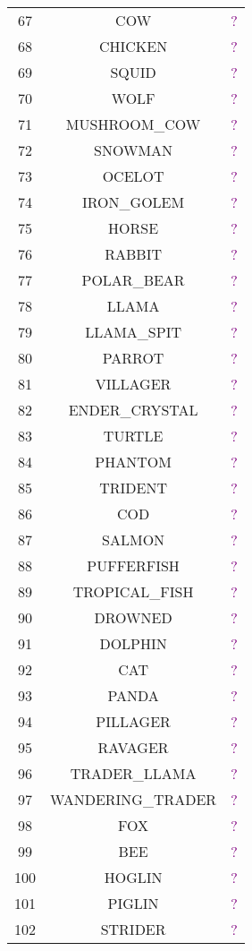 \documentclass[11pt]{article}
\newcommand\myworries[1]{\textcolor{purple}{#1}}
\begin{document}
\begin{longtable}{ |c|c|c| }
	67 & COW & \myworries{?} \\
	68 & CHICKEN & \myworries{?} \\
	69 & SQUID & \myworries{?} \\
	70 & WOLF & \myworries{?} \\
	71 & MUSHROOM\_COW & \myworries{?} \\
	72 & SNOWMAN & \myworries{?} \\
	73 & OCELOT & \myworries{?} \\
	74 & IRON\_GOLEM & \myworries{?} \\
	75 & HORSE & \myworries{?} \\
	76 & RABBIT & \myworries{?} \\
	77 & POLAR\_BEAR & \myworries{?} \\
	78 & LLAMA & \myworries{?} \\
	79 & LLAMA\_SPIT & \myworries{?} \\
	80 & PARROT & \myworries{?} \\
	81 & VILLAGER & \myworries{?} \\
	82 & ENDER\_CRYSTAL & \myworries{?} \\
	83 & TURTLE & \myworries{?} \\
	84 & PHANTOM & \myworries{?} \\
	85 & TRIDENT & \myworries{?} \\
	86 & COD & \myworries{?} \\
	87 & SALMON & \myworries{?} \\
	88 & PUFFERFISH & \myworries{?} \\
	89 & TROPICAL\_FISH & \myworries{?} \\
	90 & DROWNED & \myworries{?} \\
	91 & DOLPHIN & \myworries{?} \\
	92 & CAT & \myworries{?} \\
	93 & PANDA & \myworries{?} \\
	94 & PILLAGER & \myworries{?} \\
	95 & RAVAGER & \myworries{?} \\
	96 & TRADER\_LLAMA & \myworries{?} \\
	97 & WANDERING\_TRADER & \myworries{?} \\
	98 & FOX & \myworries{?} \\
	99 & BEE & \myworries{?} \\
	100 & HOGLIN & \myworries{?} \\
	101 & PIGLIN & \myworries{?} \\
	102 & STRIDER & \myworries{?} \\

\end{longtable}
\end{document}
